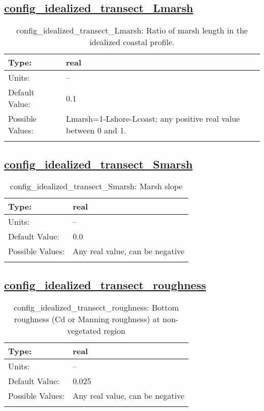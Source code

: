 \subsection[config\_idealized\_transect\_Lmarsh]{\hyperref[sec:nm_tab_tidal_boundary]{config\_idealized\_transect\_Lmarsh}}
\label{subsec:nm_sec_config_idealized_transect_Lmarsh}
\begin{center}
\begin{longtable}{| p{2.0in} || p{4.0in} |}
    \hline
    Type: & real \\
    \hline
    Units: & -- \\
    \hline
    Default Value: & 0.1 \\
    \hline
    Possible Values: & Lmarsh=1-Lshore-Lcoast; any positive real value between 0 and 1. \\
    \hline
    \caption{config\_idealized\_transect\_Lmarsh: Ratio of marsh length in the idealized coastal profile.}
\end{longtable}
\end{center}
\subsection[config\_idealized\_transect\_Smarsh]{\hyperref[sec:nm_tab_tidal_boundary]{config\_idealized\_transect\_Smarsh}}
\label{subsec:nm_sec_config_idealized_transect_Smarsh}
\begin{center}
\begin{longtable}{| p{2.0in} || p{4.0in} |}
    \hline
    Type: & real \\
    \hline
    Units: & -- \\
    \hline
    Default Value: & 0.0 \\
    \hline
    Possible Values: & Any real value, can be negative \\
    \hline
    \caption{config\_idealized\_transect\_Smarsh: Marsh slope}
\end{longtable}
\end{center}
\subsection[config\_idealized\_transect\_roughness]{\hyperref[sec:nm_tab_tidal_boundary]{config\_idealized\_transect\_roughness}}
\label{subsec:nm_sec_config_idealized_transect_roughness}
\begin{center}
\begin{longtable}{| p{2.0in} || p{4.0in} |}
    \hline
    Type: & real \\
    \hline
    Units: & -- \\
    \hline
    Default Value: & 0.025 \\
    \hline
    Possible Values: & Any real value, can be negative \\
    \hline
    \caption{config\_idealized\_transect\_roughness: Bottom roughness (Cd or Manning roughness) at non-vegetated region}
\end{longtable}
\end{center}
